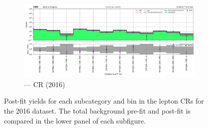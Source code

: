 \begin{figure}[htbp]
    \begin{subfigure}[b]{0.66\textwidth}
        \includegraphics[width=\textwidth]{chapters/higgstoinv/figures/mountain_ranges/2016/ttH/Zee_tree_fit_s-abs_values_ttH_cats.pdf}
        \caption{\ttH --- \doubleEleCr \gls{CR} (2016)}
    \end{subfigure}
    \caption[Post-fit yields for each \ttH subcategory and \ptmiss bin in the lepton control regions for the 2016 dataset]{Post-fit yields for each \ttH subcategory and \ptmiss bin in the lepton \glspl{CR} for the 2016 dataset. The total background pre-fit and post-fit is compared in the lower panel of each subfigure.}
    \label{fig:htoinv_mountain_range_ttH_2016_CRs}
\end{figure}


